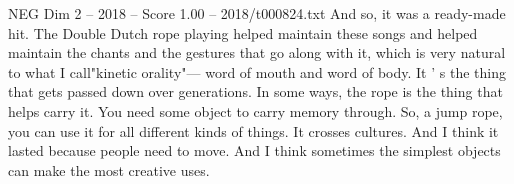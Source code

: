 \begin{textsample}{NEG Dim 2 – 2018 – Score 1.00 – 2018/t000824.txt}
And so, it was a ready-made hit.
The Double Dutch rope playing helped maintain these songs and helped maintain the chants and the gestures that go along with it, which is very natural to what I call"kinetic orality"— word of mouth and word of body.
It ' s the thing that gets passed down over generations.
In some ways, the rope is the thing that helps carry it.
You need some object to carry memory through.
So, a jump rope, you can use it for all different kinds of things.
It crosses cultures.
And I think it lasted because people need to move.
And I think sometimes the simplest objects can make the most creative uses.

\end{textsample}
